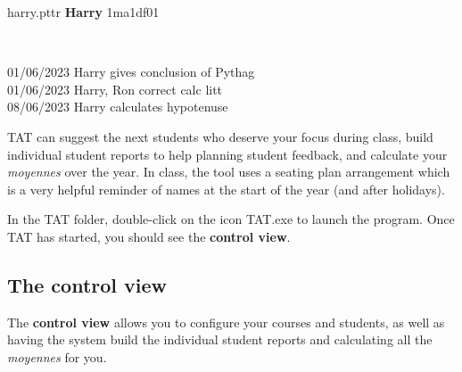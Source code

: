 \documentclass[10pt]{article}
\begin{document}
\begin{center}
\begin{tcolorbox}

harry.pttr \hfill \textbf{Harry} \hfill 1ma1df01

\

\small{
01/06/2023 Harry gives conclusion of Pythag \\
01/06/2023 Harry, Ron correct calc litt \\
08/06/2023 Harry calculates hypotenuse
}

\vspace{10mm}

\begin{center}
\end{center}

\end{tcolorbox}
\end{center}

TAT can suggest the next students who deserve your focus during class, build individual student reports to help planning student feedback, and calculate your \emph{moyennes} over the year. In class, the tool uses a seating plan arrangement which is a very helpful reminder of names at the start of the year (and after holidays).

In the TAT folder, double-click on the icon TAT.exe to launch the program. Once TAT has started, you should see the \textbf{control view}.

\subsection{The control view}

The \textbf{control view} allows you to configure your courses and students, as well as having the system build the individual student reports and calculating all the \emph{moyennes} for you.
\end{document}
